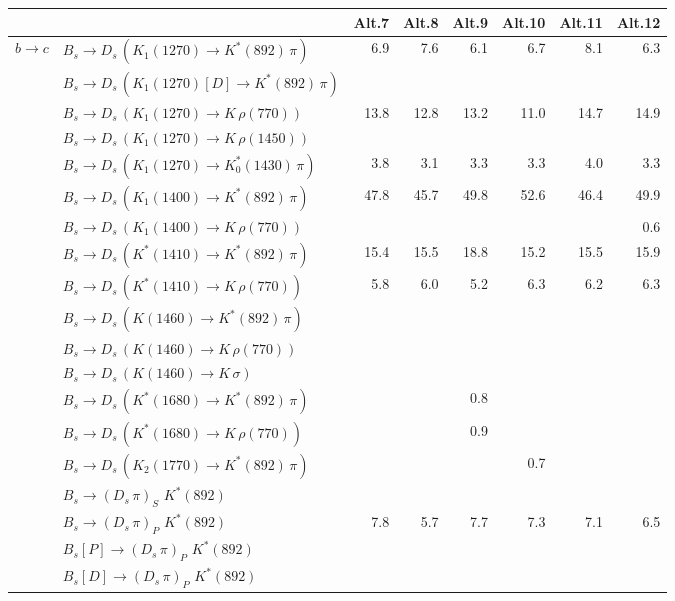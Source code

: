 \begin{tabular}{l l  r  r  r  r  r  r  } 
\toprule
&  & \multicolumn{1}{c}{Alt.7}  & \multicolumn{1}{c}{Alt.8}  & \multicolumn{1}{c}{Alt.9}  & \multicolumn{1}{c}{Alt.10}  & \multicolumn{1}{c}{Alt.11}  & \multicolumn{1}{c}{Alt.12}  \\ 
\hline
\multirow{30}{*}{$b \to c$}  & $B_s \to D_s \, ( K_1(1270) \to K^{*}(892) \, \pi )$ & 6.9 & 7.6 & 6.1 & 6.7 & 8.1 & 6.3 \\ 
 & $B_s \to D_s \, ( K_1(1270)[D] \to K^{*}(892) \, \pi )$ &  &  &  &  &  &  \\ 
 & $B_s \to D_s \, ( K_1(1270) \to K \, \rho(770) )$ & 13.8 & 12.8 & 13.2 & 11.0 & 14.7 & 14.9 \\ 
 & $B_s \to D_s \, ( K_1(1270) \to K \, \rho(1450) )$ &  &  &  &  &  &  \\ 
 & $B_s \to D_s \, ( K_1(1270) \to K^{*}_{0}(1430) \, \pi )$ & 3.8 & 3.1 & 3.3 & 3.3 & 4.0 & 3.3 \\ 
 & $B_s \to D_s \, ( K_1(1400) \to K^{*}(892) \, \pi )$ & 47.8 & 45.7 & 49.8 & 52.6 & 46.4 & 49.9 \\ 
 & $B_s \to D_s \, ( K_1(1400) \to K \, \rho(770) )$ &  &  &  &  &  & 0.6 \\ 
 & $B_s \to D_s \, ( K^{*}(1410) \to K^{*}(892) \, \pi )$ & 15.4 & 15.5 & 18.8 & 15.2 & 15.5 & 15.9 \\ 
 & $B_s \to D_s \, ( K^{*}(1410) \to K \, \rho(770) )$ & 5.8 & 6.0 & 5.2 & 6.3 & 6.2 & 6.3 \\ 
 & $B_s \to D_s \, ( K(1460) \to K^{*}(892) \, \pi )$ &  &  &  &  &  &  \\ 
 & $B_s \to D_s \, ( K(1460) \to K \, \rho(770) )$ &  &  &  &  &  &  \\ 
 & $B_s \to D_s \, ( K(1460) \to K \, \sigma )$ &  &  &  &  &  &  \\ 
 & $B_s \to D_s \, ( K^{*}(1680) \to K^{*}(892) \, \pi )$ &  &  & 0.8 &  &  &  \\ 
 & $B_s \to D_s \, ( K^{*}(1680) \to K \, \rho(770) )$ &  &  & 0.9 &  &  &  \\ 
 & $B_s \to D_s \, ( K_2(1770) \to K^{*}(892) \, \pi )$ &  &  &  & 0.7 &  &  \\ 
 & $B_s \to ( D_s \, \pi)_{S} \, \, K^{*}(892)$ &  &  &  &  &  &  \\ 
 & $B_s \to ( D_s \, \pi)_{P} \, \, K^{*}(892)$ & 7.8 & 5.7 & 7.7 & 7.3 & 7.1 & 6.5 \\ 
 & $B_s[P] \to ( D_s \, \pi)_{P} \, \, K^{*}(892)$ &  &  &  &  &  &  \\ 
 & $B_s[D] \to ( D_s \, \pi)_{P} \, \, K^{*}(892)$ &  &  &  &  &  &  \\ 

\end{tabular}
